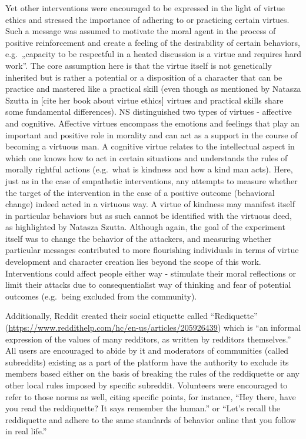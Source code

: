 \documentclass[
  10pt,
  dvipsnames,enabledeprecatedfontcommands]{scrartcl}
\begin{document}
Yet other interventions were encouraged to be expressed in the light of
virtue ethics and stressed the importance of adhering to or practicing
certain virtues. Such a message was assumed to motivate the moral agent
in the process of positive reinforcement and create a feeling of the
desirability of certain behaviors, e.g.~„capacity to be respectful in a
heated discussion is a virtue and requires hard work''. The core
assumption here is that the virtue itself is not genetically inherited
but is rather a potential or a disposition of a character that can be
practice and mastered like a practical skill (even though as mentioned
by Natasza Szutta in {[}cite her book about virtue ethics{]} virtues and
practical skills share some fundamental differences). NS distinguished
two types of virtues - affective and cognitive. Affective virtues
encompass the emotions and feelings that play an important and positive
role in morality and can act as a support in the course of becoming a
virtuous man. A cognitive virtue relates to the intellectual aspect in
which one knows how to act in certain situations and understands the
rules of morally rightful actions (e.g.~what is kindness and how a kind
man acts). Here, just as in the case of empathetic interventions, any
attempts to measure whether the target of the intervention in the case
of a positive outcome (behavioral change) indeed acted in a virtuous
way. A virtue of kindness may manifest itself in particular behaviors
but as such cannot be identified with the virtuous deed, as highlighted
by Natasza Szutta. Although again, the goal of the experiment itself was
to change the behavior of the attackers, and measuring whether
particular messages contributed to more flourishing individuals in terms
of virtue development and character creation lies beyond the scope of
this work. Interventions could affect people either way - stimulate
their moral reflections or limit their attacks due to consequentialist
way of thinking and fear of potential outcomes (e.g.~being excluded from
the community).

Additionally, Reddit created their social etiquette called
``Rediquette''
(\url{https://www.reddithelp.com/hc/en-us/articles/205926439}) which is
``an informal expression of the values of many redditors, as written by
redditors themselves.'' All users are encouraged to abide by it and
moderators of communities (called subreddits) existing as a part of the
platform have the authority to exclude its members based either on the
basis of breaking the rules of the reddiquette or any other local rules
imposed by specific subreddit. Volunteers were encouraged to refer to
those norms as well, citing specific points, for instance, ``Hey there,
have you read the reddiquette? It says remember the human.'' or ``Let's
recall the reddiquette and adhere to the same standards of behavior
online that you follow in real life.''
\end{document}
